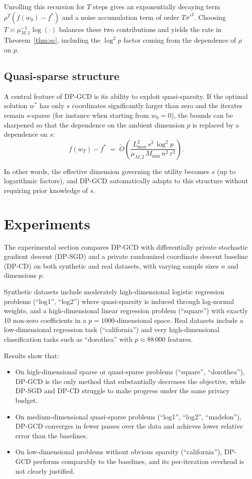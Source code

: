 \documentclass[11pt,a4paper]{article}
\begin{document}
Unrolling this recursion for \(T\) steps gives an exponentially decaying term \(\rho^T(f(w_0)-f^*)\) and a noise accumulation term of order \(T \sigma'^2\). Choosing \(T \asymp \mu_{M,1}^{-1}\log(\cdot)\) balances these two contributions and yields the rate in Theorem~\ref{thm:sc}, including the \(\log^2 p\) factor coming from the dependence of \(\rho\) on \(p\).

\subsection{Quasi-sparse structure}

A central feature of DP-GCD is its ability to exploit quasi-sparsity. If the optimal solution \(w^*\) has only \(s\) coordinates significantly larger than zero and the iterates remain \(s\)-sparse (for instance when starting from \(w_0 = 0\)), the bounds can be sharpened so that the dependence on the ambient dimension \(p\) is replaced by a dependence on \(s\):
\[
  f(w_T) - f^* \;=\; \tilde O\left( \frac{L_{\max}^2 \, s^2 \, \log^2 p}{\mu_{M,2} \, M_{\min} \, n^2 \, \varepsilon^2} \right).
\]

In other words, the effective dimension governing the utility becomes \(s\) (up to logarithmic factors), and DP-GCD automatically adapts to this structure without requiring prior knowledge of \(s\).

\section{Experiments}

The experimental section compares DP-GCD with differentially private stochastic gradient descent (DP-SGD) and a private randomized coordinate descent baseline (DP-CD) on both synthetic and real datasets, with varying sample sizes \(n\) and dimensions \(p\).

Synthetic datasets include moderately high-dimensional logistic regression problems (``log1'', ``log2'') where quasi-sparsity is induced through log-normal weights, and a high-dimensional linear regression problem (``square'') with exactly 10 non-zero coefficients in a \(p=1000\)-dimensional space. Real datasets include a low-dimensional regression task (``california'') and very high-dimensional classification tasks such as ``dorothea'' with \(p \approx 88\,000\) features.

Results show that:
\begin{itemize}
  \item On high-dimensional sparse or quasi-sparse problems (``square'', ``dorothea''), DP-GCD is the only method that substantially decreases the objective, while DP-SGD and DP-CD struggle to make progress under the same privacy budget.
  \item On medium-dimensional quasi-sparse problems (``log1'', ``log2'', ``madelon''), DP-GCD converges in fewer passes over the data and achieves lower relative error than the baselines.
  \item On low-dimensional problems without obvious sparsity (``california''), DP-GCD performs comparably to the baselines, and its per-iteration overhead is not clearly justified.
\end{itemize}
\end{document}
